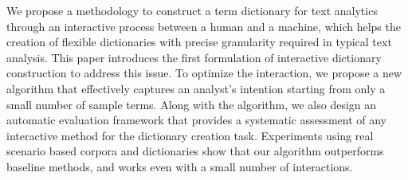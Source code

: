 We propose a methodology to construct a term dictionary for text analytics through an interactive process between a human and a machine, which helps the creation of flexible dictionaries with precise granularity required in typical text analysis. This paper introduces the first formulation of interactive dictionary construction to address this issue. To optimize the interaction, we propose a new algorithm that effectively captures an analyst's intention starting from only a small number of sample terms. Along with the algorithm, we also design an automatic evaluation framework that provides a systematic assessment of any interactive method for the dictionary creation task. Experiments using real scenario based corpora and dictionaries show that our algorithm outperforms baseline methods, and works even with a small number of interactions.
